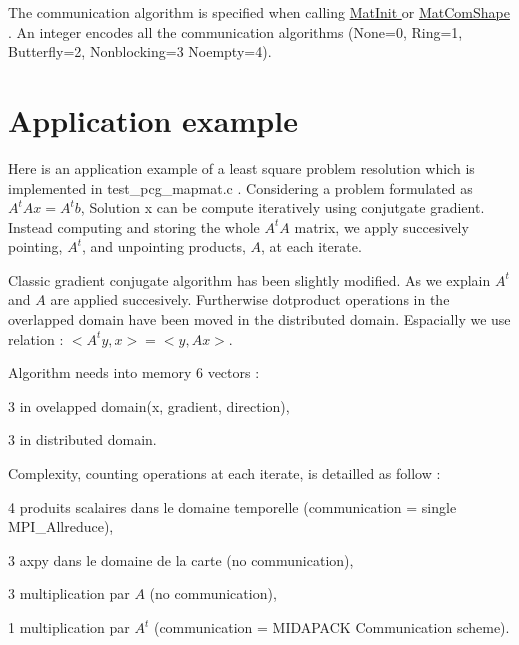 The communication algorithm is specified when calling \hyperlink{mapmat_8c_aaffd7a76c3cf2834df302d1f844aea3e}{Mat\-Init } or \hyperlink{}{Mat\-Com\-Shape }. An integer encodes all the communication algorithms (None=0, Ring=1, Butterfly=2, Nonblocking=3 Noempty=4).

\par
 \section{Application example}\label{example}
Here is an application example of a least square problem resolution which is implemented in test\-\_\-pcg\-\_\-mapmat.\-c . Considering a problem formulated as $ A^t A x = A^t b $, Solution x can be compute iteratively using conjutgate gradient. Instead computing and storing the whole $A^tA$ matrix, we apply succesively pointing, $A^t$, and unpointing products, $A$, at each iterate.

Classic gradient conjugate algorithm has been slightly modified. As we explain $A^t$ and $A$ are applied succesively. Furtherwise dotproduct operations in the overlapped domain have been moved in the distributed domain. Espacially we use relation \-: $< A^t y, x > = < y , Ax > $.

Algorithm needs into memory 6 vectors \-:
\begin{DoxyItemize}
\item 3 in ovelapped domain(x, gradient, direction),
\item 3 in distributed domain.
\end{DoxyItemize}

Complexity, counting operations at each iterate, is detailled as follow \-:
\begin{DoxyItemize}
\item 4 produits scalaires dans le domaine temporelle (communication = single M\-P\-I\-\_\-\-Allreduce),
\item 3 axpy dans le domaine de la carte (no communication),
\item 3 multiplication par $A$ (no communication),
\item 1 multiplication par $A^t$ (communication = M\-I\-D\-A\-P\-A\-C\-K Communication scheme).
\end{DoxyItemize}


